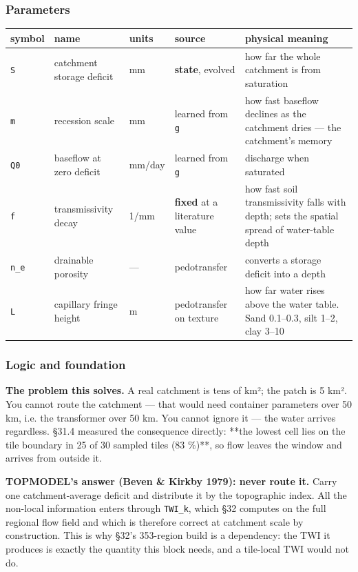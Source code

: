 \documentclass[10pt,a4paper]{article}
\begin{document}
\subsubsection*{Parameters}

\begin{center}
\footnotesize
\begin{tabularx}{\linewidth}{XXXXX}
\toprule
\textbf{symbol} & \textbf{name} & \textbf{units} & \textbf{source} & \textbf{physical meaning} \\
\midrule
\texttt{S} & catchment storage deficit & mm & \textbf{state}, evolved & how far the whole catchment is from saturation \\
\texttt{m} & recession scale & mm & learned from \texttt{g} & how fast baseflow declines as the catchment dries — the catchment's memory \\
\texttt{Q0} & baseflow at zero deficit & mm/day & learned from \texttt{g} & discharge when saturated \\
\texttt{f} & transmissivity decay & 1/mm & \textbf{fixed} at a literature value & how fast soil transmissivity falls with depth; sets the spatial spread of water-table depth \\
\texttt{n\_e} & drainable porosity & — & pedotransfer & converts a storage deficit into a depth \\
\texttt{L} & capillary fringe height & m & pedotransfer on texture & how far water rises above the water table. Sand 0.1–0.3, silt 1–2, clay 3–10 \\
\bottomrule
\end{tabularx}
\end{center}

\subsubsection*{Logic and foundation}

\textbf{The problem this solves.} A real catchment is tens of km²; the patch is
5 km². You cannot route the catchment — that would need container parameters
over 50 km, i.e. the transformer over 50 km. You cannot ignore it — the water
arrives regardless. §31.4 measured the consequence directly: **the lowest cell
lies on the tile boundary in 25 of 30 sampled tiles (83 \%)**, so flow leaves the
window and arrives from outside it.

\textbf{TOPMODEL's answer (Beven \& Kirkby 1979): never route it.} Carry one
catchment-average deficit and distribute it by the topographic index. All the
non-local information enters through \texttt{TWI\_k}, which §32 computes on the full
regional flow field and which is therefore correct at catchment scale by
construction. This is why §32's 353-region build is a dependency: the TWI it
produces is exactly the quantity this block needs, and a tile-local TWI would
not do.
\end{document}
